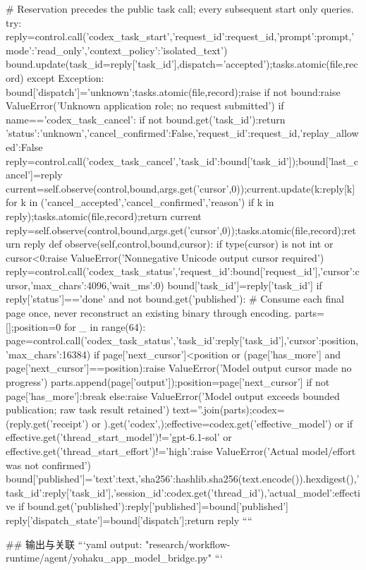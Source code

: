   # Reservation precedes the public task call; every subsequent start only queries.
   try:
    reply=control.call('codex_task_start',{'request_id':request_id,'prompt':prompt,'mode':'read_only','context_policy':'isolated_text'})
    bound.update(task_id=reply['task_id'],dispatch='accepted');tasks.atomic(file,record)
   except Exception:
    bound['dispatch']='unknown';tasks.atomic(file,record);raise
  if not bound:raise ValueError('Unknown application role; no request submitted')
  if name=='codex_task_cancel':
   if not bound.get('task_id'):return {'status':'unknown','cancel_confirmed':False,'request_id':request_id,'replay_allowed':False}
   reply=control.call('codex_task_cancel',{'task_id':bound['task_id']});bound['last_cancel']=reply
   current=self.observe(control,bound,args.get('cursor',0));current.update({k:reply[k] for k in ('cancel_accepted','cancel_confirmed','reason') if k in reply});tasks.atomic(file,record);return current
  reply=self.observe(control,bound,args.get('cursor',0));tasks.atomic(file,record);return reply
 def observe(self,control,bound,cursor):
  if type(cursor) is not int or cursor<0:raise ValueError('Nonnegative Unicode output cursor required')
  reply=control.call('codex_task_status',{'request_id':bound['request_id'],'cursor':cursor,'max_chars':4096,'wait_ms':0})
  bound['task_id']=reply['task_id']
  if reply['status']=='done' and not bound.get('published'):
   # Consume each final page once, never reconstruct an existing binary through encoding.
   parts=[];position=0
   for _ in range(64):
    page=control.call('codex_task_status',{'task_id':reply['task_id'],'cursor':position,'max_chars':16384})
    if page['next_cursor']<position or (page['has_more'] and page['next_cursor']==position):raise ValueError('Model output cursor made no progress')
    parts.append(page['output']);position=page['next_cursor']
    if not page['has_more']:break
   else:raise ValueError('Model output exceeds bounded publication; raw task result retained')
   text=''.join(parts);codex=(reply.get('receipt') or {}).get('codex',{});effective=codex.get('effective_model') or {}
   if effective.get('thread_start_model')!='gpt-6.1-sol' or effective.get('thread_start_effort')!='high':raise ValueError('Actual model/effort was not confirmed')
   bound['published']={'text':text,'sha256':hashlib.sha256(text.encode()).hexdigest(),'task_id':reply['task_id'],'session_id':codex.get('thread_id'),'actual_model':effective}
  if bound.get('published'):reply['published']=bound['published']
  reply['dispatch_state']=bound['dispatch'];return reply
````

## 输出与关联
```yaml
output: "research/workflow-runtime/agent/yohaku_app_model_bridge.py"
```
